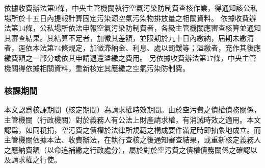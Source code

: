 依據收費辦法第9條，中央主管機關執行空氣污染防制費查核作業，得通知該公私場所於十五日內提報計算固定污染源空氣污染物排放量之相關資料。
依據收費辦法第14條，公私場所依法申報空氣污染防制費者，各級主管機關應審查核算並通知其審查結果。其結算不足者，加徵其差額，並限期於九十日內繳納，屆期未繳清者，逕依本法第74條規定，加徵滯納金、利息、處以罰鍰等；溢繳者，充作其後應繳費額之一部分或依其申請退還溢繳之費用。
另依據收費辦法第17條，中央主管機關得依據相關資料，重新核定其應繳之空氣污染防制費。


\subsubsection{核課期間}


本文認爲核課期間（核定期間）為請求權時效期間。由於空污費之債權債務關係，主管機關（行政機關）對於義務人有公法上財產請求權，有消滅時效之適用。本文認爲，如同稅捐，空污費之債權於法律所規範之構成要件滿足時即抽象地成立。而主管機關依據本法、收費辦法，在執行查核之後通知審查結果，或重新核定義務人之應納費額（以命追補繳之行政處分），屬於對於空污費之債權債務關係之確認以及請求權之行使。

